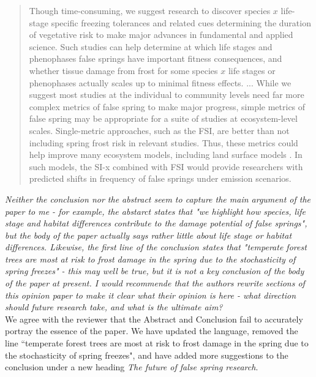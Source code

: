 \documentclass[11pt,a4paper]{article}
\begin{document}
\begin{quotation}
Though time-consuming, we suggest research to discover species \(x\) life-stage specific freezing tolerances and related cues determining the duration of vegetative risk %
to make major advances in fundamental and applied science. Such studies can help determine at which life stages and phenophases false springs have important fitness consequences, and whether tissue damage from frost for some species \(x\) life stages or phenophases actually scales up to minimal fitness effects. 
...
While we suggest most studies at the individual to community levels need far more complex metrics of false spring to make major progress, simple metrics of false spring may be appropriate for a suite of studies at ecosystem-level scales. Single-metric approaches, such as the FSI, are better than not including spring frost risk in relevant studies. Thus, these metrics could help improve many ecosystem models, including land surface models \citep{Foley1998, Moorcroft2001, Prentice1992, Thornton2005}. In such models, the SI-x combined with FSI would provide researchers with predicted shifts in frequency of false springs under emission scenarios. 
\end{quotation} 

\textit{Neither the conclusion nor the abstract seem to capture the main argument of the paper to me - for example, the abstarct states that "we highlight how species, life stage and habitat differences contribute to the damage potential of false springs", but the body of the paper actually says rather little about life stage or habitat differences.  Likewise, the first line of the conclusion states that "temperate forest trees are most at risk to frost damage in the spring due to the stochasticity of spring freezes" - this may well be true, but it is not a key conclusion of the body of the paper at present. I would recommende that the authors rewrite sections of this opinion paper to make it clear what their opinion is here - what direction should future research take, and what is the ultimate aim?} \\

We agree with the reviewer that the Abstract and Conclusion fail to accurately portray the essence of the paper. We have updated the language, removed the line ``temperate forest trees are most at risk to frost damage in the spring due to the stochasticity of spring freezes", and have added more suggestions to the conclusion under a new heading \textit{The future of false spring research}. \\ 
\end{document}
